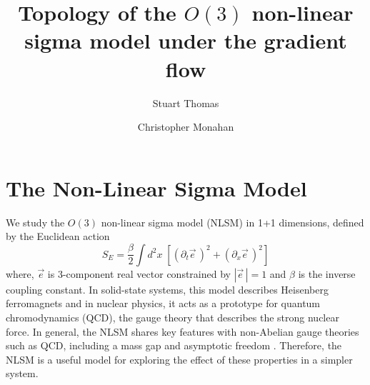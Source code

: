 \documentclass[a4paper,11pt]{article}
\title{Topology of the $O(3)$ non-linear sigma model under the gradient flow}
\author*[a]{Stuart Thomas}
\author[a]{Christopher Monahan}
\affiliation[a]{Department of Physics, William \& Mary,  Williamsburg, Virginia 23187, USA}
\newcommand{\e}{\vec e}
\begin{document}
\maketitle


\section{The Non-Linear Sigma Model}
            We study the $O(3)$ non-linear sigma model (NLSM) in 1+1 dimensions, defined by the Euclidean action
            \begin{equation*}
                \label{eq:nlsm euclidean action}
                S_E = \frac{\beta}{2} \int d^2x \; \left[ \left(\partial_t \e\, \right)^2+ \left( \partial_x \e\,\right)^2 \right]
            \end{equation*}
        where, $\e$ is 3-component real vector constrained by $|\e\,|=1$ and $\beta$ is the inverse coupling constant. In solid-state systems, this model describes Heisenberg ferromagnets \cite{callan1985} and in nuclear physics, it acts as a prototype for quantum chromodynamics (QCD), the gauge theory that describes the strong nuclear force. In general, the NLSM shares key features with non-Abelian gauge theories such as QCD, including a mass gap and asymptotic freedom \cite{polyakov1975}. Therefore, the NLSM is a useful model for exploring the effect of these properties in a simpler system.



\end{document}
